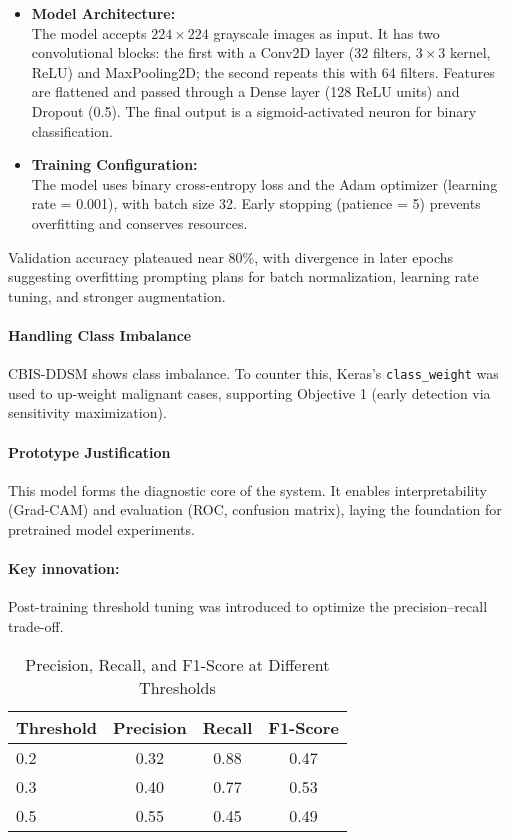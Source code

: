 \documentclass[12pt]{article}
\begin{document}
\begin{itemize}
    \item \textbf{Model Architecture:} \\
    The model accepts $224 \times 224$ grayscale images as input. It has two convolutional blocks: the first with a Conv2D layer (32 filters, $3 \times 3$ kernel, ReLU) and MaxPooling2D; the second repeats this with 64 filters. Features are flattened and passed through a Dense layer (128 ReLU units) and Dropout (0.5). The final output is a sigmoid-activated neuron for binary classification.
    
    \item \textbf{Training Configuration:} \\
    The model uses binary cross-entropy loss and the Adam optimizer (learning rate = 0.001), with batch size 32. Early stopping (patience = 5) prevents overfitting and conserves resources.
\end{itemize}

Validation accuracy plateaued near 80\%, with divergence in later epochs suggesting overfitting prompting plans for batch normalization, learning rate tuning, and stronger augmentation.

\paragraph{Handling Class Imbalance} CBIS-DDSM shows class imbalance. To counter this, Keras’s \texttt{class\_weight} was used to up-weight malignant cases, supporting Objective 1 (early detection via sensitivity maximization).

\paragraph{Prototype Justification} This model forms the diagnostic core of the system. It enables interpretability (Grad-CAM) and evaluation (ROC, confusion matrix), laying the foundation for pretrained model experiments.

\paragraph{Key innovation:} Post-training threshold tuning was introduced to optimize the precision–recall trade-off.

\begin{table}[H]
\centering
\caption{Precision, Recall, and F1-Score at Different Thresholds}
\begin{tabular}{lccc}
\toprule
Threshold & Precision & Recall & F1-Score \\
\midrule
0.2 & 0.32 & 0.88 & 0.47 \\
0.3 & 0.40 & 0.77 & 0.53 \\
0.5 & 0.55 & 0.45 & 0.49 \\
\bottomrule
\end{tabular}
\end{table}
\end{document}
